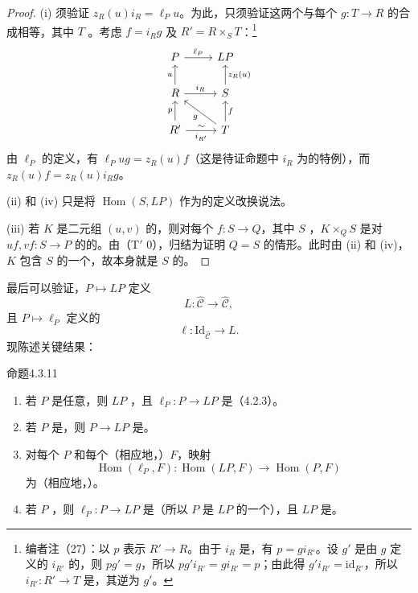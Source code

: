 \begin{proof}
(i) 须验证 $z_R(u)i_R=\ell_Pu$。为此，只须验证这两个与每个 $g:T\to R$ 的合成相等，其中 $T$ 。考虑 $f=i_Rg$ 及 $R'=R\times_S T$：\footnote{编者注（27）：以 $p$ 表示 $R'\to R$。由于 $i_R$ 是，有 $p=gi_{R'}$。设 $g'$ 是由 $g$ 定义的 $i_{R'}$ 的，则 $pg'=g$，所以 $pg'i_{R'}=gi_{R'}=p$；由此得 $g'i_{R'}=\mathrm{id}_{R'}$，所以 $i_{R'}:R'\to T$ 是，其逆为 $g'$。}
\[
\begin{tikzcd}
P\arrow[r,"\ell_P"]&LP\\
R\arrow[u,"u"]\arrow[r,"i_R"]&S\arrow[u,"z_R(u)"']\\
R'\arrow[u,"p"]\arrow[r,"i_{R'}"',"\sim"]&T\arrow[u,"f"']\arrow[ul,"g"]
\end{tikzcd}
\]
由 $\ell_P$ 的定义，有 $\ell_Pug=z_R(u)f$（这是待证命题中 $i_R$ 为的特例），而 $z_R(u)f=z_R(u)i_Rg$。

(ii) 和 (iv) 只是将 $\operatorname{Hom}(S,LP)$ 作为的定义改换说法。

(iii) 若 $K$ 是二元组 $(u,v)$ 的，则对每个 $f:S\to Q$，其中 $S$ ，$K\times_Q S$ 是对 $uf,vf:S\to P$ 的的。由（T$'$ 0），归结为证明 $Q=S$ 的情形。此时由 (ii) 和 (iv)，$K$ 包含 $S$ 的一个，故本身就是 $S$ 的。
\end{proof}
最后可以验证，$P\mapsto LP$ 定义
\[
L:\widehat{\mathcal C}\longrightarrow\widehat{\mathcal C},
\]
且 $P\mapsto\ell_P$ 定义的
\[
\ell:\mathrm{Id}_{\widehat{\mathcal C}}\longrightarrow L.
\]
现陈述关键结果：
\begin{SGAresult}{命题}{4.3.11}
\begin{enumerate}
\item[(i)] 若 $P$ 是任意，则 $LP$ ，且 $\ell_P:P\to LP$ 是（4.2.3）。
\item[(ii)] 若 $P$ 是，则 $P\to LP$ 是。
\item[(iii)] 对每个 $P$ 和每个（相应地，）$F$，映射
\[
\operatorname{Hom}(\ell_P,F):\operatorname{Hom}(LP,F)\longrightarrow\operatorname{Hom}(P,F)
\]
为（相应地，）。
\item[(iv)] 若 $P$ ，则 $\ell_P:P\to LP$ 是（所以 $P$ 是 $LP$ 的一个），且 $LP$ 是。
\end{enumerate}
\end{SGAresult}
